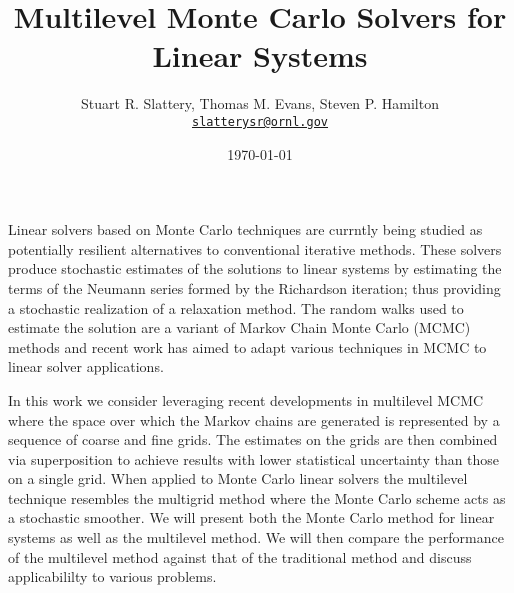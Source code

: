\documentclass[letterpaper,12pt]{article}
\author{Stuart R. Slattery, Thomas M. Evans, Steven P. Hamilton
\\ \href{mailto:slatterysr@ornl.gov}{\texttt{slatterysr@ornl.gov}}
}
\date{\today} \title{Multilevel Monte Carlo Solvers for Linear Systems}
\begin{document}
\maketitle

\abstract

Linear solvers based on Monte Carlo techniques are currntly being
studied as potentially resilient alternatives to conventional
iterative methods. These solvers produce stochastic estimates of the
solutions to linear systems by estimating the terms of the Neumann
series formed by the Richardson iteration; thus providing a stochastic
realization of a relaxation method. The random walks used to estimate
the solution are a variant of Markov Chain Monte Carlo (MCMC) methods
and recent work has aimed to adapt various techniques in MCMC to
linear solver applications.

In this work we consider leveraging recent developments in multilevel
MCMC where the space over which the Markov chains are generated is
represented by a sequence of coarse and fine grids. The estimates on
the grids are then combined via superposition to achieve results with
lower statistical uncertainty than those on a single grid. When
applied to Monte Carlo linear solvers the multilevel technique
resembles the multigrid method where the Monte Carlo scheme acts as a
stochastic smoother. We will present both the Monte Carlo method for
linear systems as well as the multilevel method. We will then compare
the performance of the multilevel method against that of the
traditional method and discuss applicabililty to various problems.
\end{document}
